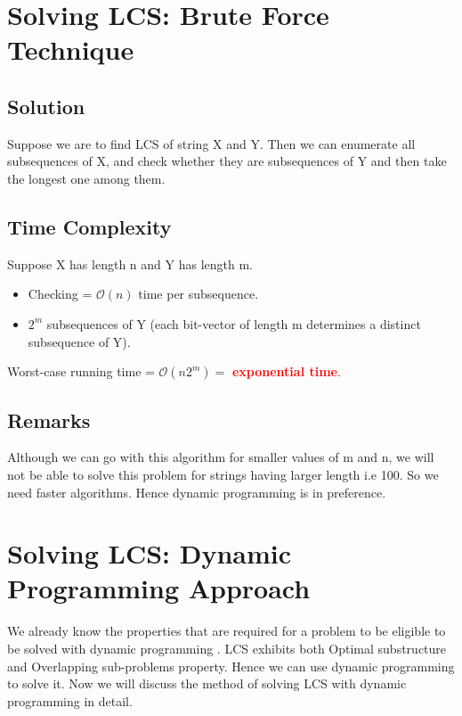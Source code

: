 \documentclass{report}
\begin{document}
    \chapter{Solving LCS: Brute Force Technique}
    \section{Solution}
    Suppose we are to find LCS of string X and Y.
    Then we can enumerate all subsequences of X, and check whether they are subsequences of Y and then take the longest one among them.
    \section{Time Complexity}
    Suppose X has length n and Y has length m.
    \begin{itemize}
        \item Checking = $\mathcal{O}(n)$ time per subsequence.
        \item $2^m$ subsequences of Y (each bit-vector of length m determines a distinct subsequence of Y).
    \end{itemize}
    Worst-case running time = $\mathcal{O}(n2^m) = $ \textcolor{red}{\textbf{exponential time}}.
    
    \section{Remarks}
    Although we can go with this algorithm for smaller values of m and n, we will not be able to solve this problem for strings having larger length i.e 100. So we need faster algorithms. Hence dynamic programming is in preference.
    
    
    
    
    
    
    \chapter{Solving LCS: Dynamic Programming Approach}
    We already know the properties that are required for a problem to be eligible to be solved with dynamic programming . LCS exhibits both Optimal substructure and Overlapping sub-problems property. Hence we can use dynamic programming to solve it. Now we will discuss the method of solving LCS with dynamic programming in detail.
\end{document}
